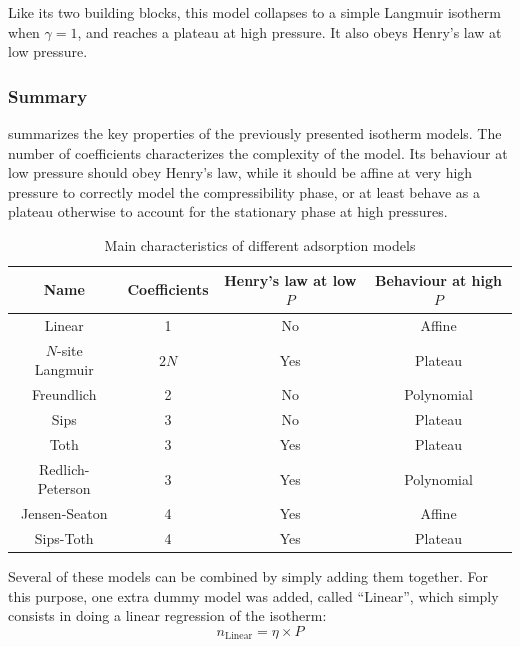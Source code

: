 \documentclass[main.tex]{subfiles}
\begin{document}
Like its two building blocks, this model collapses to a simple Langmuir isotherm when $\gamma = 1$, and reaches a plateau at high pressure. It also obeys Henry's law at low pressure.

\subsubsection{Summary}

 summarizes the key properties of the previously presented isotherm models. The number of coefficients characterizes the complexity of the model. Its behaviour at low pressure should obey Henry's law, while it should be affine at very high pressure to correctly model the compressibility phase, or at least behave as a plateau otherwise to account for the stationary phase at high pressures.

\begin{table}[h]
	\centering
	\begin{tabular}{|c|c|c|c|}
		\hline
		\bf Name & \bf Coefficients & \bf Henry's law at low $P$ & \bf Behaviour at high $P$\\\hline
		Linear & 1 & \cellcolor{red!25}No & \cellcolor{green!25}Affine\\\hline
		$N$-site Langmuir & $2N$ & \cellcolor{green!25}Yes & \cellcolor{yellow!25}Plateau \\\hline
		Freundlich & 2 & \cellcolor{red!25} No & \cellcolor{red!25}Polynomial \\\hline
		Sips & 3 & \cellcolor{red!25}No & \cellcolor{yellow!25}Plateau \\\hline
		Toth & 3 & \cellcolor{green!25}Yes & \cellcolor{yellow!25}Plateau \\\hline
		Redlich-Peterson & 3 & \cellcolor{green!25}Yes & \cellcolor{red!25}Polynomial \\\hline
		Jensen-Seaton & 4 & \cellcolor{green!25}Yes & \cellcolor{green!25}Affine \\\hline
		Sips-Toth & 4 & \cellcolor{green!25}Yes & \cellcolor{yellow!25}Plateau \\\hline
	\end{tabular}
	\caption{Main characteristics of different adsorption models}\label{table:adsorptionmodels}
\end{table}

Several of these models can be combined by simply adding them together. For this purpose, one extra dummy model was added, called ``Linear'', which simply consists in doing a linear regression of the isotherm:
\[n_\text{Linear} = \eta\times P\]
\end{document}
